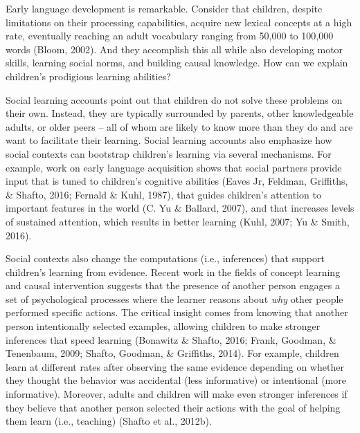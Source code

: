 \documentclass[oneside]{report}
\begin{document}
Early language development is remarkable. Consider that children,
despite limitations on their processing capabilities, acquire new
lexical concepts at a high rate, eventually reaching an adult vocabulary
ranging from 50,000 to 100,000 words (Bloom, 2002). And they accomplish
this all while also developing motor skills, learning social norms, and
building causal knowledge. How can we explain children's prodigious
learning abilities?

Social learning accounts point out that children do not solve these
problems on their own. Instead, they are typically surrounded by
parents, other knowledgeable adults, or older peers -- all of whom are
likely to know more than they do and are want to facilitate their
learning. Social learning accounts also emphasize how social contexts
can bootstrap children's learning via several mechanisms. For example,
work on early language acquisition shows that social partners provide
input that is tuned to children's cognitive abilities (Eaves Jr,
Feldman, Griffiths, \& Shafto, 2016; Fernald \& Kuhl, 1987), that guides
children's attention to important features in the world (C. Yu \&
Ballard, 2007), and that increases levels of sustained attention, which
results in better learning (Kuhl, 2007; Yu \& Smith, 2016).

Social contexts also change the computations (i.e., inferences) that
support children's learning from evidence. Recent work in the fields of
concept learning and causal intervention suggests that the presence of
another person engages a set of psychological processes where the
learner reasons about \emph{why} other people performed specific
actions. The critical insight comes from knowing that another person
intentionally selected examples, allowing children to make stronger
inferences that speed learning (Bonawitz \& Shafto, 2016; Frank,
Goodman, \& Tenenbaum, 2009; Shafto, Goodman, \& Griffiths, 2014). For
example, children learn at different rates after observing the same
evidence depending on whether they thought the behavior was accidental
(less informative) or intentional (more informative). Moreover, adults
and children will make even stronger inferences if they believe that
another person selected their actions with the goal of helping them
learn (i.e., teaching) (Shafto et al., 2012b).
\end{document}
